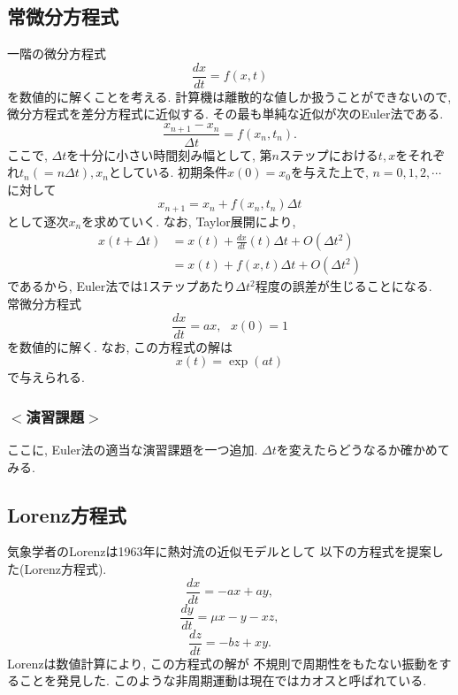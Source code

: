 \documentclass[a4j]{jsarticle}
\begin{document}
\subsection{常微分方程式}
一階の微分方程式
\begin{equation}
\frac{dx}{dt}=f(x,t)
\end{equation}
を数値的に解くことを考える. 
計算機は離散的な値しか扱うことができないので, 微分方程式を差分方程式に近似する. 
その最も単純な近似が次のEuler法である. 
\begin{equation}
\frac{x_{n+1}-x_{n}}{\Delta t}=f(x_n,t_n). 
\end{equation}
ここで, $\Delta t$を十分に小さい時間刻み幅として, 
第$n$ステップにおける$t, x$をそれぞれ$t_n(=n \Delta t), x_n$としている. 
初期条件$x(0)=x_0$を与えた上で, $n=0, 1, 2, \cdots$に対して
\begin{equation}
x_{n+1}=x_{n}+f(x_n,t_n)\Delta t
\end{equation}
として逐次$x_n$を求めていく. なお, Taylor展開により,  
\begin{equation}
\begin{split}
x(t+\Delta t)&=x(t)+\frac{dx}{dt}(t)\Delta t+O(\Delta t^2)\\
&=x(t)+f(x,t)\Delta t+O(\Delta t^2)
\end{split}
\end{equation}
であるから, Euler法では1ステップあたり$\Delta t^2$程度の誤差が生じることになる. \\

常微分方程式
\begin{equation}
\frac{dx}{dt}=ax, \ \ \ x(0)=1
\end{equation}
を数値的に解く. なお, この方程式の解は
\begin{equation}
x(t)=\exp(at)
\end{equation}
で与えられる. 



\subsubsection*{$<$演習課題$>$}
ここに, Euler法の適当な演習課題を一つ追加. 
$\Delta t$を変えたらどうなるか確かめてみる. 

\subsection{Lorenz方程式}
気象学者のLorenzは1963年に熱対流の近似モデルとして
以下の方程式を提案した(Lorenz方程式). 
\begin{equation}
\dfrac{dx}{dt}=-ax+ay, 
\end{equation}
\begin{equation}
\dfrac{dy}{dt}=\mu x-y-xz, 
\end{equation}
\begin{equation}
\dfrac{dz}{dt}=-bz+xy. 
\end{equation}
Lorenzは数値計算により, この方程式の解が
不規則で周期性をもたない振動をすることを発見した. 
このような非周期運動は現在ではカオスと呼ばれている. 
\end{document}
